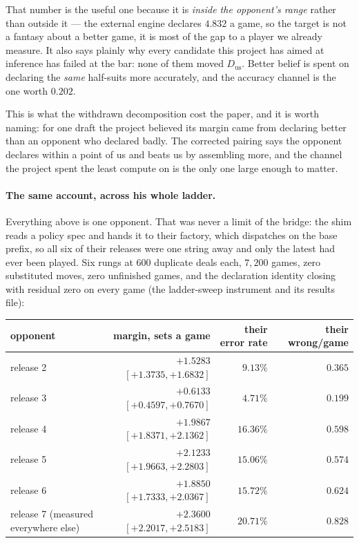 \documentclass[11pt,letterpaper]{article}
\begin{document}
That number is the useful one because it is \emph{inside the opponent's range}
rather than outside it --- the external engine declares $4.832$ a game, so the
target is not a fantasy about a better game, it is most of the gap to a player we
already measure. It also says plainly why every candidate this project has aimed
at inference has failed at the bar: none of them moved $D_{\text{us}}$. Better
belief is spent on declaring the \emph{same} half-suits more accurately, and the
accuracy channel is the one worth $0.202$.

This is what the withdrawn decomposition cost the paper, and it is worth
naming: for one draft the project believed its margin came from declaring
better than an opponent who declared badly. The corrected pairing says the
opponent declares within a point of us and beats us by assembling more, and
the channel the project spent the least compute on is the only one large
enough to matter.

\paragraph{The same account, across his whole ladder.}
\label{sec:ladder-sweep}
Everything above is one opponent. That was never a limit of the bridge: the
shim reads a policy spec and hands it to their factory, which dispatches on
the base prefix, so all six of their releases were one string away and only
the latest had ever been played. Six rungs at $600$ duplicate deals each, $7{,}200$
games, zero substituted moves, zero unfinished games, and the declaration
identity closing with residual zero on every game
(the ladder-sweep instrument and its results file):

\begin{center}
\footnotesize
\begin{tabular}{lrrr}
\toprule
opponent & margin, sets a game & their error rate & their wrong/game \\
\midrule
release 2 & $+1.5283$ $[+1.3735, +1.6832]$ & $9.13\%$  & $0.365$ \\
release 3 & $+0.6133$ $[+0.4597, +0.7670]$ & $4.71\%$  & $0.199$ \\
release 4 & $+1.9867$ $[+1.8371, +2.1362]$ & $16.36\%$ & $0.598$ \\
release 5 & $+2.1233$ $[+1.9663, +2.2803]$ & $15.06\%$ & $0.574$ \\
release 6 & $+1.8850$ $[+1.7333, +2.0367]$ & $15.72\%$ & $0.624$ \\
release 7 (measured everywhere else) & $+2.3600$ $[+2.2017, +2.5183]$ & $20.71\%$ & $0.828$ \\
\bottomrule
\end{tabular}
\end{center}
\end{document}
